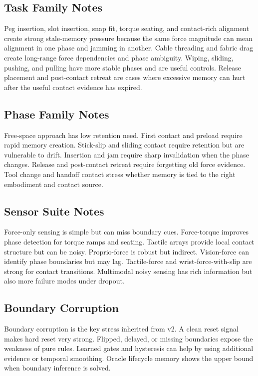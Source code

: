 \documentclass{article}
\begin{document}
\subsection{Task Family Notes}

Peg insertion, slot insertion, snap fit, torque seating, and contact-rich
alignment create strong stale-memory pressure because the same force magnitude
can mean alignment in one phase and jamming in another. Cable threading and
fabric drag create long-range force dependencies and phase ambiguity. Wiping,
sliding, pushing, and pulling have more stable phases and are useful controls.
Release placement and post-contact retreat are cases where excessive memory can
hurt after the useful contact evidence has expired.

\subsection{Phase Family Notes}

Free-space approach has low retention need. First contact and preload require
rapid memory creation. Stick-slip and sliding contact require retention but are
vulnerable to drift. Insertion and jam require sharp invalidation when the
phase changes. Release and post-contact retreat require forgetting old force
evidence. Tool change and handoff contact stress whether memory is tied to the
right embodiment and contact source.

\subsection{Sensor Suite Notes}

Force-only sensing is simple but can miss boundary cues. Force-torque improves
phase detection for torque ramps and seating. Tactile arrays provide local
contact structure but can be noisy. Proprio-force is robust but indirect.
Vision-force can identify phase boundaries but may lag. Tactile-force and
wrist-force-with-slip are strong for contact transitions. Multimodal noisy
sensing has rich information but also more failure modes under dropout.

\subsection{Boundary Corruption}

Boundary corruption is the key stress inherited from v2. A clean reset signal
makes hard reset very strong. Flipped, delayed, or missing boundaries expose
the weakness of pure rules. Learned gates and hysteresis can help by using
additional evidence or temporal smoothing. Oracle lifecycle memory shows the
upper bound when boundary inference is solved.
\end{document}
